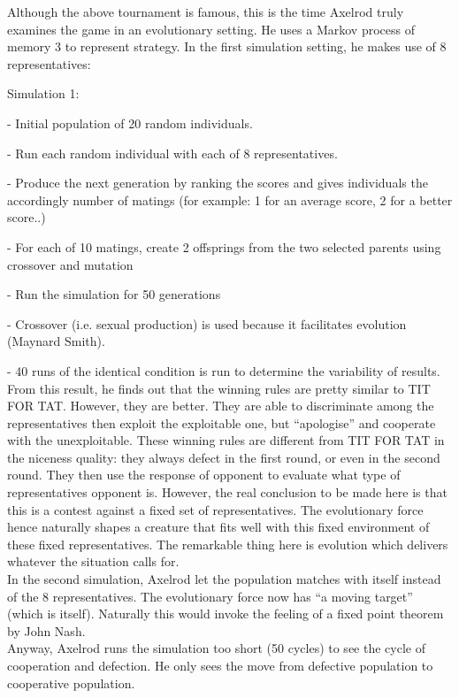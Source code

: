 \documentclass[12.5pt]{report}
\begin{document}
Although the above tournament is famous, this is the time Axelrod truly examines the game in an evolutionary setting. He uses a Markov process of memory 3 to represent strategy. In the first simulation setting, he makes use of 8 representatives:

Simulation 1:

- Initial population of 20 random individuals.

- Run each random individual with each of 8 representatives.

- Produce the next generation by ranking the scores and gives individuals the accordingly number of matings (for example: 1 for an average score, 2 for a better score..)

- For each of 10 matings, create 2 offsprings from the two selected parents using crossover and mutation

- Run the simulation for 50 generations

- Crossover (i.e. sexual production) is used because it facilitates evolution (Maynard Smith).

- 40 runs of the identical condition is run to determine the variability of results.\\

From this result, he finds out that the winning rules are pretty similar to TIT FOR TAT. However, they are better. They are able to discriminate among the representatives then exploit the exploitable one, but “apologise” and cooperate with the unexploitable. These winning rules are different from TIT FOR TAT in the niceness quality: they always defect in the first round, or even in the second round. They then use the response of opponent to evaluate what type of representatives opponent is.
However, the real conclusion to be made here is that this is a contest against a fixed set of representatives. The evolutionary force hence naturally shapes a creature that fits well with this fixed environment of these fixed representatives. The remarkable thing here is evolution which delivers whatever the situation calls for.\\

In the second simulation, Axelrod let the population matches with itself instead of the 8 representatives. The evolutionary force now has “a moving target” (which is itself). Naturally this would invoke the feeling of a fixed point theorem by John Nash.\\

Anyway, Axelrod runs the simulation too short (50 cycles) to see the cycle of cooperation and defection. He only sees the move from defective population to cooperative population.
\end{document}
